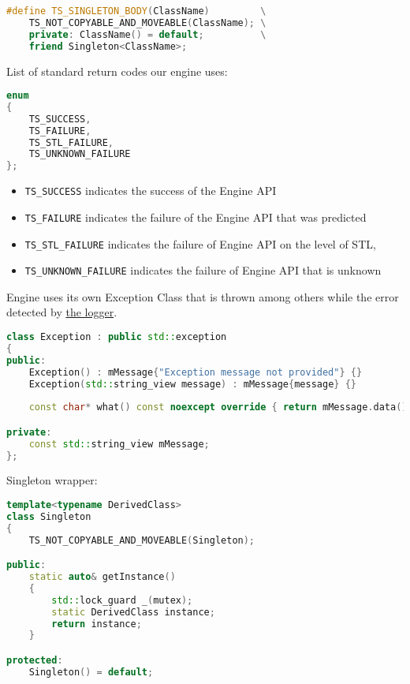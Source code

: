 \begin{itemize}
\begin{itemize}
\begin{lstlisting}[language=c++, caption=Macros of Public Engine Utils(./engine/include/tsengine/utils.hpp)]
#define TS_SINGLETON_BODY(ClassName)         \
    TS_NOT_COPYABLE_AND_MOVEABLE(ClassName); \
    private: ClassName() = default;          \
    friend Singleton<ClassName>;
\end{lstlisting}
\label{sec:return_codes}
List of standard return codes our engine uses:
\begin{lstlisting}[language=c++, caption=Return Codes of Public Engine Utils(./engine/include/tsengine/utils.hpp)]
enum
{
    TS_SUCCESS,
    TS_FAILURE,
    TS_STL_FAILURE,
    TS_UNKNOWN_FAILURE
};
\end{lstlisting}
\begin{itemize}
    \item \texttt{TS\_SUCCESS} indicates the success of the Engine API
    \item \texttt{TS\_FAILURE} indicates the failure of the Engine API that was predicted
    \item \texttt{TS\_STL\_FAILURE} indicates the failure of Engine API on the level of STL,
    \item \texttt{TS\_UNKNOWN\_FAILURE} indicates the failure of Engine API that is unknown
\end{itemize}
Engine uses its own Exception Class that is thrown among others while the error detected by \hyperref[sec:logger]{the logger}.
\begin{lstlisting}[language=c++, caption=Exception of Public Engine Utils(./engine/include/tsengine/utils.hpp)]
class Exception : public std::exception
{
public:
    Exception() : mMessage{"Exception message not provided"} {}
    Exception(std::string_view message) : mMessage{message} {}
    
    const char* what() const noexcept override { return mMessage.data(); }

private:
    const std::string_view mMessage;
};
\end{lstlisting}
Singleton wrapper:
\begin{lstlisting}[language=c++, caption=Singleton of Public Engine Utils(./engine/include/tsengine/utils.hpp)]
template<typename DerivedClass>
class Singleton
{
    TS_NOT_COPYABLE_AND_MOVEABLE(Singleton);

public:
    static auto& getInstance()
    {
        std::lock_guard _(mutex);
        static DerivedClass instance;
        return instance;
    }

protected:
    Singleton() = default;


\end{lstlisting}
\end{itemize}
\end{itemize}
